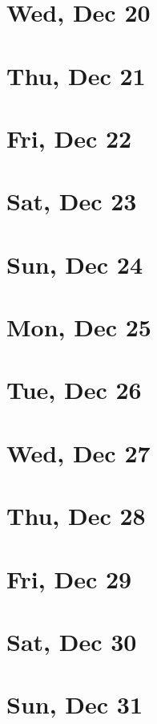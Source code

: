 	\section{Wed, Dec 20}
		
	\section{Thu, Dec 21}
		
	\section{Fri, Dec 22}
		
	\section{Sat, Dec 23}
		
	\section{Sun, Dec 24}
		
	\section{Mon, Dec 25}
		
	\section{Tue, Dec 26}
		
	\section{Wed, Dec 27}
		
	\section{Thu, Dec 28}
		
	\section{Fri, Dec 29}
		
	\section{Sat, Dec 30}
		
	\section{Sun, Dec 31}
		
